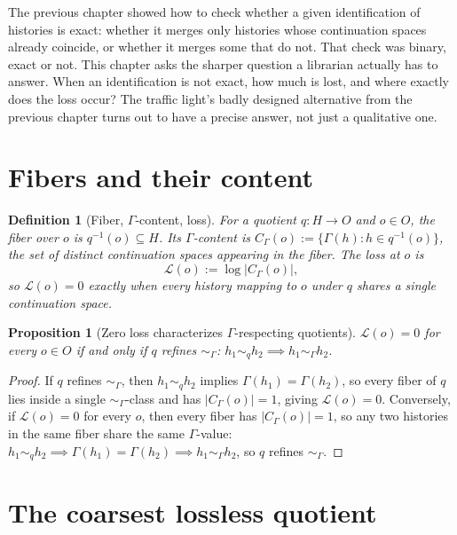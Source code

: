 \documentclass[11pt]{report}
\newtheorem{proposition}{Proposition}[chapter]
\newtheorem{definition}{Definition}[chapter]
\begin{document}
The previous chapter showed how to check whether a given
identification of histories is exact: whether it merges only
histories whose continuation spaces already coincide, or whether it
merges some that do not. That check was binary, exact or not. This
chapter asks the sharper question a librarian actually has to answer.
When an identification is not exact, how much is lost, and where
exactly does the loss occur? The traffic light's badly designed
alternative from the previous chapter turns out to have a precise
answer, not just a qualitative one.

\section*{Fibers and their content}

\begin{definition}[Fiber, $\Gamma$-content, loss]
For a quotient $q : H \to O$ and $o \in O$, the fiber over $o$ is
$q^{-1}(o) \subseteq H$. Its $\Gamma$-content is
$C_\Gamma(o) := \{\Gamma(h) : h \in q^{-1}(o)\}$, the set of distinct
continuation spaces appearing in the fiber. The loss at $o$ is
\[
\mathcal{L}(o) := \log |C_\Gamma(o)|,
\]
so $\mathcal{L}(o) = 0$ exactly when every history mapping to $o$
under $q$ shares a single continuation space.
\end{definition}

\begin{proposition}[Zero loss characterizes $\Gamma$-respecting quotients]
\label{prop:zeroloss}
$\mathcal{L}(o) = 0$ for every $o \in O$ if and only if $q$ refines
$\sim_\Gamma$: $h_1 \sim_q h_2 \implies h_1 \sim_\Gamma h_2$.
\end{proposition}
\begin{proof}
If $q$ refines $\sim_\Gamma$, then $h_1 \sim_q h_2$ implies
$\Gamma(h_1) = \Gamma(h_2)$, so every fiber of $q$ lies inside a
single $\sim_\Gamma$-class and has $|C_\Gamma(o)| = 1$, giving
$\mathcal{L}(o) = 0$. Conversely, if $\mathcal{L}(o) = 0$ for every
$o$, then every fiber has $|C_\Gamma(o)| = 1$, so any two histories in
the same fiber share the same $\Gamma$-value: $h_1 \sim_q h_2 \implies
\Gamma(h_1) = \Gamma(h_2) \implies h_1 \sim_\Gamma h_2$, so $q$
refines $\sim_\Gamma$.
\end{proof}

\section*{The coarsest lossless quotient}
\end{document}
